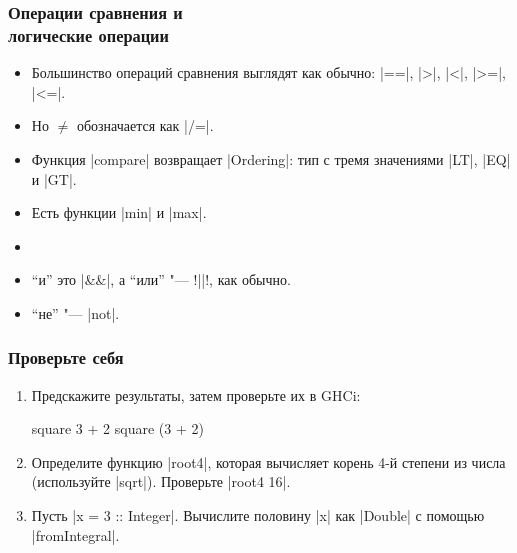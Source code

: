 \documentclass[10pt]{beamer}
\begin{document}
\begin{frame}[fragile]
  \frametitle{Операции сравнения и\\логические операции}
  \begin{itemize}
    \item Большинство операций сравнения выглядят как обычно: \haskinline|==|, \haskinline|>|, \haskinline|<|, \haskinline|>=|, \haskinline|<=|.
    \item Но $\neq$ обозначается как \haskinline|/=|.
    \item Функция \haskinline|compare| возвращает \haskinline|Ordering|: тип с тремя значениями \haskinline|LT|, \haskinline|EQ| и \haskinline|GT|.
    \item Есть функции \haskinline|min| и \haskinline|max|.
    \item[]
    \item \enquote{и} это \haskinline|&&|, а \enquote{или} "--- \haskinline!||!, как обычно.
    \item \enquote{не} "--- \haskinline|not|.
  \end{itemize}
\end{frame}

\begin{frame}[fragile]
  \frametitle{Проверьте себя}
  \begin{enumerate}
    \item Предскажите результаты, затем проверьте их в GHCi:
          \begin{haskell}
            square 3 + 2
            square (3 + 2)
          \end{haskell}
    \item Определите функцию \haskinline|root4|, которая вычисляет корень 4-й степени из числа (используйте \haskinline|sqrt|). Проверьте \haskinline|root4 16|.
    \item Пусть \haskinline|x = 3 :: Integer|. Вычислите половину \haskinline|x| как \haskinline|Double| с помощью \haskinline|fromIntegral|.
  \end{enumerate}
\end{frame}
\end{document}
